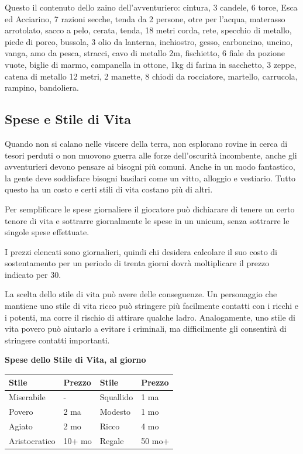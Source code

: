 \begin{multicols}{2}
Questo il contenuto dello zaino dell'avventuriero: cintura, 3 candele, 6 torce, Esca ed Acciarino, 7 razioni secche, tenda da 2 persone, otre per l'acqua, materasso arrotolato, sacco a pelo, cerata, tenda, 18 metri corda, rete, specchio di metallo, piede di porco, bussola, 3 olio da lanterna, inchiostro, gesso, carboncino, uncino, vanga, amo da pesca, stracci, cavo di metallo 2m, fischietto, 6 fiale da pozione vuote, biglie di marmo, campanella in ottone, 1kg di farina in sacchetto, 3 zeppe, catena di metallo 12 metri, 2 manette, 8 chiodi da rocciatore, martello, carrucola, rampino, bandoliera.


\subsection{Spese e Stile di Vita}

Quando non si calano nelle viscere della terra, non esplorano rovine in cerca di tesori perduti o non muovono guerra alle forze dell'oscurità incombente, anche gli avventurieri devono pensare ai bisogni più comuni. Anche in un modo fantastico, la gente deve soddisfare bisogni basilari come un vitto, alloggio e vestiario. Tutto questo ha un costo e certi stili di vita costano più di altri.

Per semplificare le spese giornaliere il giocatore può dichiarare di tenere un certo tenore di vita e sottrarre giornalmente le spese in un unicum, senza sottrarre le singole spese effettuate.

I prezzi elencati sono giornalieri, quindi chi desidera calcolare il suo costo di sostentamento per un periodo di trenta giorni dovrà moltiplicare il prezzo indicato per 30.

La scelta dello stile di vita può avere delle conseguenze. Un personaggio che mantiene uno stile di vita ricco può stringere più facilmente contatti con i ricchi e i potenti, ma corre il rischio di attirare qualche ladro. Analogamente, uno stile di vita povero può aiutarlo a evitare i criminali, ma difficilmente gli consentirà di stringere contatti importanti.

\medskip

\textbf{Spese dello Stile di Vita, al giorno}

\medskip

\noindent\begin{tabular}{ll|ll}
	\toprule
\rowcolor{gray!20}\textbf{Stile}&\textbf{Prezzo}&\textbf{Stile}&\textbf{Prezzo}\\
\toprule
Miserabile&-&Squallido&1 ma\\
\rowcolor{gray!20}Povero&2 ma&Modesto&1 mo\\
Agiato&2 mo&Ricco&4 mo\\
\rowcolor{gray!20}Aristocratico&10+ mo&Regale &50 mo+\\
\end{tabular}


\end{multicols}
